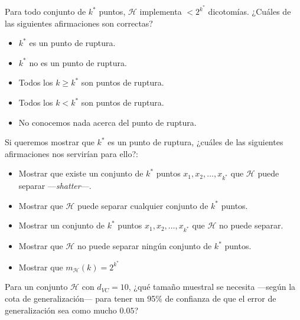 \documentclass[a4paper, 11pt]{article}
\begin{document}
    \begin{ejercicio}
        Para todo conjunto de $k^*$ puntos, $\mathcal{H}$ implementa $< 2^{k^*}$ dicotomías. ¿Cuáles de las siguientes afirmaciones son correctas?
        \begin{itemize}
            \item $k^*$ es un punto de ruptura.
            \item $k^*$ no es un punto de ruptura.
            \item Todos los $k \geq k^*$ son puntos de ruptura.
            \item Todos los $k < k^*$ son puntos de ruptura.
            \item No conocemos nada acerca del punto de ruptura.
        \end{itemize}
    \end{ejercicio}



    \begin{ejercicio}
        Si queremos mostrar que $k^*$ es un punto de ruptura, ¿cuáles de las siguientes afirmaciones nos servirían para ello?:
        \begin{itemize}
            \item Mostrar que existe un conjunto de $k^*$ puntos $x_1, x_2 , \dots , x_{k^*}$ que $\mathcal{H}$ puede separar ---\emph{shatter}---.
            \item Mostrar que $\mathcal{H}$ puede separar cualquier conjunto de $k^*$ puntos.
            \item Mostrar un conjunto de $k^*$ puntos $x_1, x_2 , \dots , x_{k^*}$ que $\mathcal{H}$ no puede separar.
            \item Mostrar que $\mathcal{H}$ no puede separar ningún conjunto de $k^*$ puntos.
            \item Mostrar que $m_\mathcal{H} (k) = 2^{k^*}$
        \end{itemize}
    \end{ejercicio}


    \begin{ejercicio}
        Para un conjunto $\mathcal{H}$ con $d_{VC} = 10$, ¿qué tamaño muestral se necesita ---según la cota de generalización--- para tener un 95\% de confianza de que el error de generalización sea como mucho $0.05$?
    \end{ejercicio}
\end{document}
